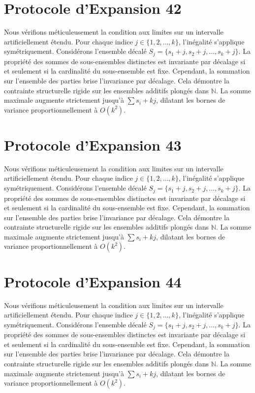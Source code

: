 \documentclass[12pt, a4paper, french]{article}
\theoremstyle{definition}
\begin{document}
\section{Protocole d'Expansion 42}
Nous vérifions méticuleusement la condition aux limites sur un intervalle artificiellement étendu. Pour chaque indice $j \in \{1, 2, \dots, k\}$, l'inégalité s'applique symétriquement. Considérons l'ensemble décalé $S_j = \{s_1 + j, s_2 + j, \dots, s_k + j\}$. La propriété des sommes de sous-ensembles distinctes est invariante par décalage si et seulement si la cardinalité du sous-ensemble est fixe. Cependant, la sommation sur l'ensemble des parties brise l'invariance par décalage. Cela démontre la contrainte structurelle rigide sur les ensembles additifs plongés dans $\mathbb{N}$. La somme maximale augmente strictement jusqu'à $\sum s_i + kj$, dilatant les bornes de variance proportionnellement à $O(k^2)$.

\section{Protocole d'Expansion 43}
Nous vérifions méticuleusement la condition aux limites sur un intervalle artificiellement étendu. Pour chaque indice $j \in \{1, 2, \dots, k\}$, l'inégalité s'applique symétriquement. Considérons l'ensemble décalé $S_j = \{s_1 + j, s_2 + j, \dots, s_k + j\}$. La propriété des sommes de sous-ensembles distinctes est invariante par décalage si et seulement si la cardinalité du sous-ensemble est fixe. Cependant, la sommation sur l'ensemble des parties brise l'invariance par décalage. Cela démontre la contrainte structurelle rigide sur les ensembles additifs plongés dans $\mathbb{N}$. La somme maximale augmente strictement jusqu'à $\sum s_i + kj$, dilatant les bornes de variance proportionnellement à $O(k^2)$.

\section{Protocole d'Expansion 44}
Nous vérifions méticuleusement la condition aux limites sur un intervalle artificiellement étendu. Pour chaque indice $j \in \{1, 2, \dots, k\}$, l'inégalité s'applique symétriquement. Considérons l'ensemble décalé $S_j = \{s_1 + j, s_2 + j, \dots, s_k + j\}$. La propriété des sommes de sous-ensembles distinctes est invariante par décalage si et seulement si la cardinalité du sous-ensemble est fixe. Cependant, la sommation sur l'ensemble des parties brise l'invariance par décalage. Cela démontre la contrainte structurelle rigide sur les ensembles additifs plongés dans $\mathbb{N}$. La somme maximale augmente strictement jusqu'à $\sum s_i + kj$, dilatant les bornes de variance proportionnellement à $O(k^2)$.
\end{document}
